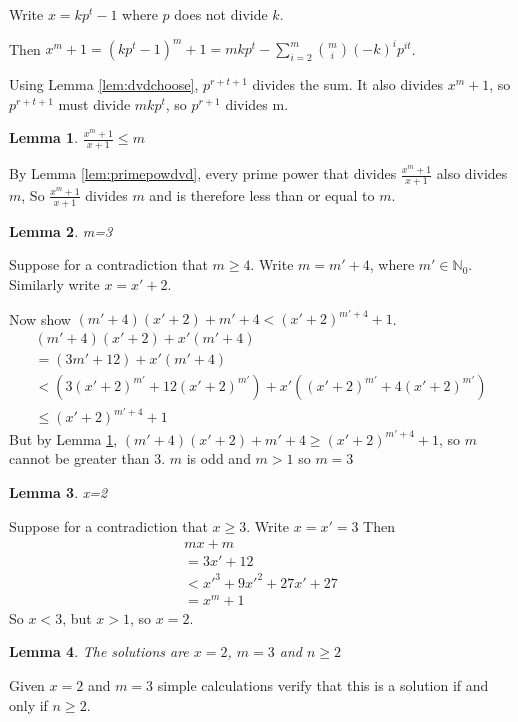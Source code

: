 \documentclass[11pt]{article} %
\newtheorem{lemma}{Lemma}
\begin{document}
Write $x = kp^t - 1$ where $p$ does not divide $k$.

Then $x^m+1 = (kp^t-1)^m + 1 = mkp^t- \sum_{i=2}^{m} {{m}\choose{i}} (-k)^i p^{it}$.

Using Lemma \ref{lem:dvdchoose}, $p^{r + t + 1}$ divides the sum. It also divides $x^m+1$, so
$p^{r+ t + 1}$ must divide $mkp^t$, so $p^{r+1}$ divides m.

\begin{lemma}\label{lem:ltm}
  $\frac{x^m+1}{x+1} \le m$
\end{lemma}

By Lemma \ref{lem:primepowdvd}, every prime power that divides $\frac{x^m+1}{x+1}$ also divides $m$,
So $\frac{x^m+1}{x+1}$ divides $m$ and is therefore less than or equal to $m$.

\begin{lemma}
  m=3
\end{lemma}
Suppose for a contradiction that $m \ge 4$. Write $m = m' + 4$, where $m' \in \mathbb{N}_0$.
Similarly write $x = x' + 2$.

Now show $(m' + 4) (x' + 2) + m' + 4 < (x' + 2)^{m' + 4} + 1$.
\begin{equation}
  \begin{aligned}
    (m' + 4) (x' + 2) + x'(m' + 4) \\
    = (3m'+12) + x'(m'+4) \\
    < (3(x' + 2)^{m'} + 12(x'+2)^{m'}) + x'((x' + 2)^{m'} + 4(x'+2)^{m'}) \\
    \le (x' + 2)^{m' + 4} + 1
  \end{aligned}
\end{equation}
But by Lemma \ref{lem:ltm}, $(m' + 4) (x' + 2) + m' + 4 \ge (x' + 2)^{m' + 4} + 1$,
so $m$ cannot be greater than $3$. $m$ is odd and $m > 1$ so $m = 3$

\begin{lemma}
  x=2
\end{lemma}
Suppose for a contradiction that $x \ge 3$. Write $x = x' = 3$
Then
\begin{equation}
  \begin{aligned}
    mx + m  \\
    = 3x' + 12  \\
    < {x'}^3+9{x'}^2 + 27{x'} + 27 \\
    = x^m+1
  \end{aligned}
\end{equation}
So $x < 3$, but $x > 1$, so $x = 2$.

\begin{lemma}
  The solutions are $x=2$, $m=3$ and $n \ge 2$
\end{lemma}
Given $x=2$ and $m=3$ simple calculations verify that this is a solution if and only if $n\ge2$.
\end{document}
